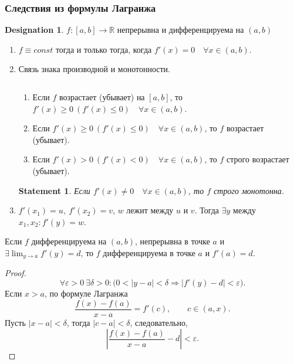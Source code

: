 \documentclass[11pt]{book}
\newcommand{\R}{\mathbb{R}}
\renewcommand{\le}{\leqslant}
\renewcommand{\ge}{\geqslant}
\theoremstyle{definition}
\theoremstyle{plain}
\theoremstyle{plain}
\newtheorem*{st}{Statement}
\theoremstyle{definition}
\newtheorem*{name}{Designation}
\theoremstyle{remark}
\begin{document}
\subsubsection{Следствия из формулы Лагранжа}
\begin{name}
    $ f: [a, b] \to \R$ непрерывна и дифференцируема на $ (a, b)$
\end{name}
\begin{enumerate}
    \item $ f \equiv const $ тогда и только тогда, когда  $ f'(x) = 0 \quad \forall x \in (a, b)$.
    \item Связь знака производной и монотонности.
	\begin{thm}
	    $ $
	    \begin{enumerate}
		\item Если $ f$ возрастает (убывает) на $ [a, b]$, то $ f'(x) \ge 0~ (f'(x) \le 0) \quad \forall x \in (a, b) $.
		\item  Если $ f'(x) \ge  0 ~(f'(x) \le  0) \quad \forall x \in (a, b)$, то $ f$ возрастает (убывает).
		\item  Если $ f'(x) > 0 ~(f'(x) < 0) \quad \forall x \in (a, b)$, то $ f$ строго возрастает (убывает).
	    \end{enumerate}
	\end{thm}
	\begin{st}
	    Если $ f'(x) \ne 0 \quad \forall x \in (a, b)$, то $ f$ строго монотонна.
	\end{st}
    \item $ f'(x_1) = u, ~ f'(x_2) = v$, $ w$ лежит между  $ u$ и $ v$. Тогда  $ \exists y$ между $ x_1, x_2: f'(y) = w$.
\end{enumerate}
\begin{thm}
    Если  $ f$  дифференцируема на $ (a, b)$, непрерывна в точке $ a$  и $ \exists \lim_{y \to  a} f'(y) = d $, то $ f$ дифференцируема в точке $ a$ и $ f'(a) = d$.
\end{thm}
\begin{proof}
    \[
	\forall \varepsilon >0 ~ \exists \delta >0: \bigl( 0< |y-a|<\delta \Longrightarrow |f'(y) - d| < \varepsilon\bigr)
    .\] 
    Если $ x >a$, по формуле Лагранжа  \[
	\frac{f(x)-f(a)}{x-a} = f'(c), \qquad c \in (a, x)
    .\] 
    Пусть $ |x - a|<\delta$,  тогда $ |c-a| < \delta$, следовательно, \[
	\left| \frac{f(x) - f(a)}{x-a} -d\right| < \varepsilon  
    .\] 
\end{proof}
\end{document}
